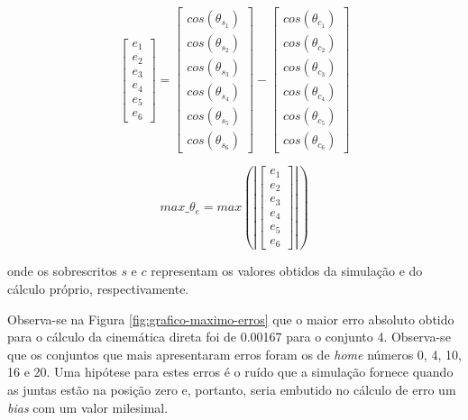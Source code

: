 \begin{equation}\label{eq:erro-de-valores-de-juntas}
	\begin{bmatrix}
		e_{1} \\ 
		e_{2} \\ 
		e_{3} \\
		e_{4} \\
		e_{5} \\
		e_{6}
	\end{bmatrix}
	=
	\begin{bmatrix}
		cos(\theta_{s_{1}}) \\ 
		cos(\theta_{s_{2}}) \\ 
		cos(\theta_{s_{3}}) \\
		cos(\theta_{s_{4}}) \\
		cos(\theta_{s_{5}}) \\
		cos(\theta_{s_{6}})
	\end{bmatrix}
-
	\begin{bmatrix}
		cos(\theta_{c_{1}}) \\ 
		cos(\theta_{c_{2}}) \\ 
		cos(\theta_{c_{3}}) \\
		cos(\theta_{c_{4}}) \\
		cos(\theta_{c_{5}}) \\
		cos(\theta_{c_{6}})
	\end{bmatrix}
\end{equation}

\begin{equation}\label{eq:max-erro-de-valores-de-juntas}
	 max\_\theta_{e} = max\left(\left|
	\begin{bmatrix}
		e_{1} \\ 
		e_{2} \\ 
		e_{3} \\
		e_{4} \\
		e_{5} \\
		e_{6}
	\end{bmatrix}
	\right|\right)
\end{equation}

onde os sobrescritos $s$ e $c$ representam os valores obtidos da simulação e do cálculo próprio,
respectivamente.

Observa-se na Figura \ref{fig:grafico-maximo-erros} que o maior erro absoluto obtido para o cálculo da
cinemática direta foi de 0.00167 para o conjunto 4. Observa-se que os conjuntos que mais apresentaram
erros foram os de \textit{home} números 0, 4, 10, 16 e 20. Uma hipótese para estes erros é o ruído que a
simulação fornece quando as juntas estão na posição zero e, portanto, seria embutido no cálculo de erro
um \textit{bias} com um valor milesimal.

